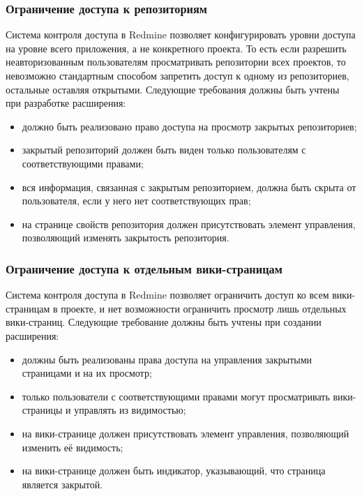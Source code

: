\subsubsection{Ограничение доступа к репозиториям}
\label{definiton:private_repository}
Система контроля доступа в Redmine позволяет конфигурировать уровни доступа на
уровне всего приложения, а не конкретного проекта. То есть если разрешить
неавторизованным пользователям просматривать репозитории всех проектов, то
невозможно стандартным способом запретить доступ к одному из репозиториев,
остальные оставляя открытыми. Следующие требования должны быть учтены при
разработке расширения:
\begin{itemize}
  \item должно быть реализовано право доступа на просмотр закрытых
  репозиториев;
  \item закрытый репозиторий должен быть виден только пользователям с
  соответствующими правами;  
  \item вся информация, связанная с закрытым репозиторием, должна быть скрыта
  от пользователя, если у него нет соответствующих прав;
  \item на странице свойств репозитория должен присутствовать элемент
  управления, позволяющий изменять закрытость репозитория.
\end{itemize}

\subsubsection{Ограничение доступа к отдельным вики-страницам}
\label{definition:private_wiki}
Система контроля доступа в Redmine позволяет ограничить доступ ко всем
вики-страницам в проекте, и нет возможности ограничить просмотр лишь отдельных
вики-страниц. Следующие требование должны быть учтены при создании расширения:
\begin{itemize}
  \item должны быть реализованы права доступа на управления закрытыми
  страницами и на их просмотр;
  \item только пользователи с соответствующими правами могут просматривать
  вики-страницы и управлять из видимостью;   
  \item на вики-странице должен присутствовать элемент управления, позволяющий
  изменить её видимость;
  \item на вики-странице должен быть индикатор, указывающий, что страница
  является закрытой.
\end{itemize}

